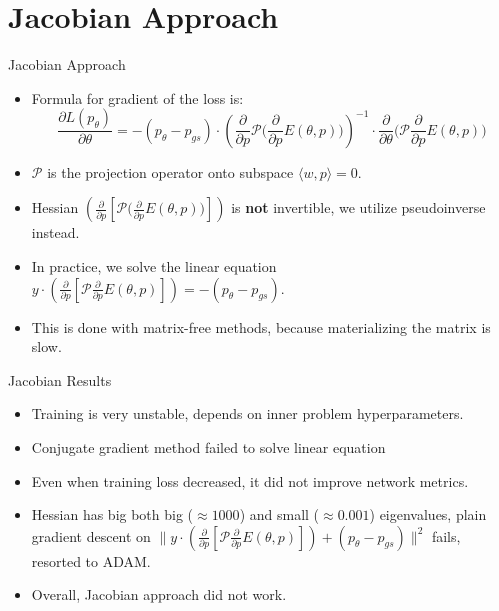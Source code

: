 \documentclass{beamer}
\begin{document}
\section{Jacobian Approach}
\begin{frame}{Jacobian Approach}
  \begin{itemize}
    \item Formula for gradient of the loss is:
    \[
      \frac{\partial L(p_{\theta})}{\partial \theta} = -(p_{\theta}-p_{gs}) \cdot \left(\frac{\partial}{\partial p}\mathcal{P}\big(\frac{\partial}{\partial p} E(\theta, p)\big)\right)^{-1} \cdot \frac{\partial}{\partial \theta}\big(\mathcal{P}\frac{\partial}{\partial p} E(\theta, p)\big)
    \]
    \item  $\mathcal{P}$ is the projection operator onto subspace $\langle w,p \rangle = 0$.
    \item Hessian $ \left(\frac{\partial}{\partial p}[\mathcal{P}\big(\frac{\partial}{\partial p} E(\theta, p)\big)]\right)$ is \textbf{not} invertible, we utilize pseudoinverse instead.
    \item In practice, we solve the linear equation $ y \cdot \left(\frac{\partial}{\partial p}[\mathcal{P} \frac{\partial}{\partial p} E(\theta, p)]\right) = -(p_{\theta}-p_{gs})$.
    \item This is done with matrix-free methods, because materializing the matrix is slow.
  \end{itemize}
\end{frame}

\begin{frame}{Jacobian Results}
  \begin{itemize}
    \item Training is very unstable, depends on inner problem hyperparameters.
    \item Conjugate gradient method failed to solve linear equation
    \item Even when training loss decreased, it did not improve network metrics.
    \item Hessian has big both big ($\approx 1000$) and small ($\approx 0.001$) eigenvalues, plain gradient descent on $\|y \cdot \left(\frac{\partial}{\partial p}[\mathcal{P}\frac{\partial}{\partial p} E(\theta, p)]\right) + (p_{\theta}-p_{gs})\|^2$ fails, resorted to ADAM.
    \item Overall, Jacobian approach did not work.
  \end{itemize}
\end{frame}
\end{document}
